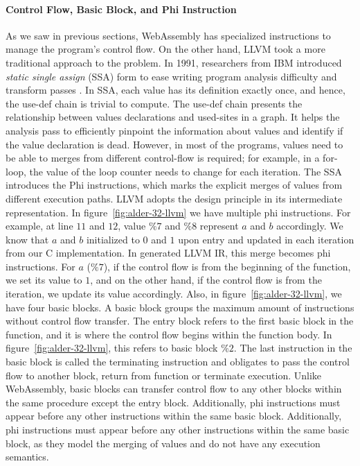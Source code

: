 \paragraph{Control Flow, Basic Block, and Phi Instruction}
As we saw in previous sections, WebAssembly has specialized instructions to
manage the program's control flow. On the other hand, LLVM took a more
traditional approach to the problem. In 1991, researchers from IBM introduced
\emph{static single assign} (SSA) form to ease writing program analysis
difficulty and transform passes \cite{ibm-ssa}. In SSA, each value has its
definition exactly once, and hence, the use-def chain is trivial to compute.
The use-def chain presents the relationship between values declarations and
used-sites in a graph. It helps the analysis pass to efficiently pinpoint the
information about values and identify if the value declaration is dead. However,
in most of the programs, values need to be able to merges from different
control-flow is required; for example, in a for-loop, the value of the loop
counter needs to change for each iteration. The SSA introduces the Phi
instructions, which marks the explicit merges of values from different execution
paths. LLVM adopts the design principle in its intermediate representation. In
figure~\ref{fig:alder-32-llvm} we have multiple phi instructions. For example,
at line $11$ and $12$, value $\%7$ and $\%8$ represent $a$ and $b$ accordingly.
We know that $a$ and $b$ initialized to $0$ and $1$ upon entry and updated in
each iteration from our C implementation. In generated LLVM IR, this merge
becomes phi instructions. For $a$ ($\%7$), if the control flow is from the
beginning of the function, we set its value to $1$, and on the other hand, if
the control flow is from the iteration, we update its value accordingly. Also,
in figure~\ref{fig:alder-32-llvm}, we have four basic blocks. A basic block
groups the maximum amount of instructions without control flow transfer. The
entry block refers to the first basic block in the function, and it is where
the control flow begins within the function body. In
figure~\ref{fig:alder-32-llvm}, this refers to basic block $\%2$. The last
instruction in the basic block is called the terminating instruction and
obligates to pass the control flow to another block, return from function or
terminate execution. Unlike WebAssembly, basic blocks can transfer control flow
to any other blocks within the same procedure except the entry block.
Additionally, phi instructions must appear before any other instructions within
the same basic block. Additionally, phi instructions must appear before any
other instructions within the same basic block, as they model the merging of
values and do not have any execution semantics. 

